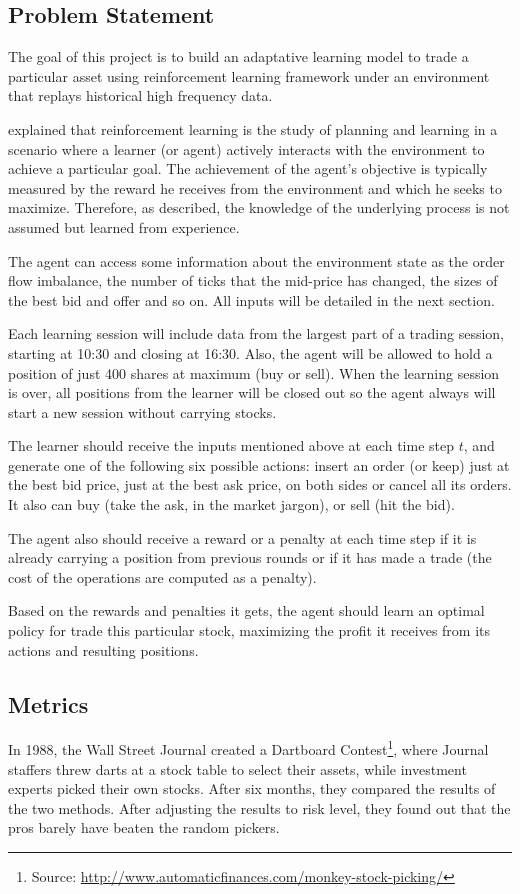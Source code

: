 \documentclass[a4paper]{article}
\begin{document}
\subsection{Problem Statement}
The goal of this project is to build an adaptative learning model to trade a particular asset using reinforcement learning framework under an environment that replays historical high frequency data.

\cite{Mohri_2012} explained that reinforcement learning is the study of planning and learning in a scenario where a learner (or agent) actively interacts with the environment to achieve a particular goal. The achievement of the agent's objective is typically measured by the reward he receives from the environment and which he seeks to maximize. Therefore, as \cite{chan2001electronic} described, the knowledge of the underlying process is not assumed but learned from experience.

The agent can access some information about the environment state as the order flow imbalance, the number of ticks that the mid-price has changed, the sizes of the best bid and offer and so on. All inputs will be detailed in the next section.

Each learning session will include data from the largest part of a trading session, starting at 10:30 and closing at 16:30. Also, the agent will be allowed to hold a position of just 400 shares at maximum (buy or sell). When the learning session is over, all positions from the learner will be closed out so the agent always will start a new session without carrying stocks.

The learner should receive the inputs mentioned above at each time step $t$, and generate one of the following six possible actions: insert an order (or keep) just at the best bid price, just at the best ask price, on both sides or cancel all its orders. It also can buy (take the ask, in the market jargon), or sell (hit the bid).

The agent also should receive a reward or a penalty at each time step if it is already carrying a position from previous rounds or if it has made a trade (the cost of the operations are computed as a penalty).

Based on the rewards and penalties it gets, the agent should learn an optimal policy for trade this particular stock, maximizing the profit it receives from its actions and resulting positions.

\subsection{Metrics}
In 1988, the Wall Street Journal created a Dartboard Contest\footnote{Source: \url{http://www.automaticfinances.com/monkey-stock-picking/}}, where Journal staffers threw darts at a stock table to select their assets, while investment experts picked their own stocks. After six months, they compared the results of the two methods. After adjusting the results to risk level, they found out that the pros barely have beaten the random pickers.
\end{document}
